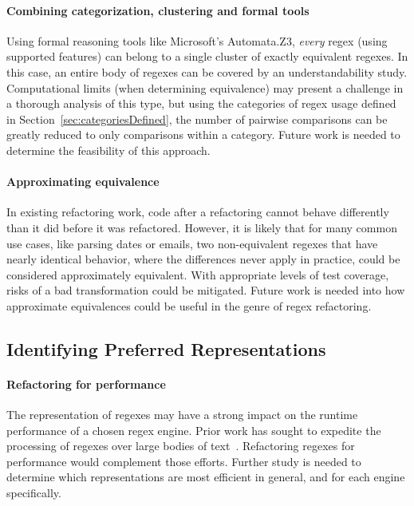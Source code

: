\paragraph{Combining categorization, clustering and formal tools}  Using formal reasoning tools like Microsoft's Automata.Z3, \emph{every} regex (using supported features) can belong to a single cluster of exactly equivalent regexes.  In this case, an entire body of regexes can be covered by an understandability study.  Computational limits (when determining equivalence) may present a challenge in a thorough analysis of this type, but using the categories of regex usage defined in Section~\ref{sec:categoriesDefined}, the number of pairwise comparisons can be greatly reduced to only comparisons within a category.  Future work is needed to determine the feasibility of this approach.

\paragraph{Approximating equivalence}  In existing refactoring work, code after a refactoring cannot behave differently than it did before it was refactored.  However, it is likely that for many common use cases, like parsing dates or emails, two non-equivalent regexes that have nearly identical behavior, where the differences never apply in practice, could be considered approximately equivalent.  With appropriate levels of test coverage, risks of a bad transformation could be mitigated.  Future work is needed into how approximate equivalences could be useful in the genre of regex refactoring.

\subsection{Identifying Preferred Representations}

\paragraph{Refactoring for performance}  The representation of regexes may have a strong impact on the runtime performance of a chosen regex engine. Prior work has sought to expedite the processing of regexes over large bodies of text~\cite{Baeza-Yates:1996:FTS:235809.235810}.  Refactoring regexes for performance would complement those efforts.  Further study is needed to determine which representations are most efficient in general, and for each engine specifically.

